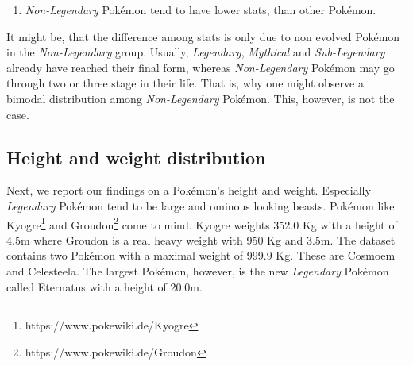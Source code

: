 \documentclass[conference]{IEEEtran}
\begin{document}
\begin{enumerate}
	\item \textit{Non-Legendary} Pokémon tend to have lower stats, than other Pokémon.
\end{enumerate}
It might be, that the difference among stats is only due to non evolved Pokémon in the \textit{Non-Legendary} group. Usually, \textit{Legendary}, \textit{Mythical} and \textit{Sub-Legendary} already have reached their final form, whereas \textit{Non-Legendary} Pokémon may go through two or three stage in their life. That is, why one might observe a bimodal distribution among \textit{Non-Legendary} Pokémon. This, however, is not the case.
\subsection{Height and weight distribution}
Next, we report our findings on a Pokémon's height and weight. Especially \textit{Legendary} Pokémon tend to be large and ominous looking beasts. Pokémon like Kyogre\footnote{https://www.pokewiki.de/Kyogre} and Groudon\footnote{https://www.pokewiki.de/Groudon} come to mind. Kyogre weights 352.0 Kg with a height of 4.5m where Groudon is a real heavy weight with 950 Kg and 3.5m. The dataset contains two Pokémon with a maximal weight of 999.9 Kg. These are Cosmoem and Celesteela. The largest Pokémon, however, is the new \textit{Legendary} Pokémon called Eternatus with a height of 20.0m. 
\end{document}
